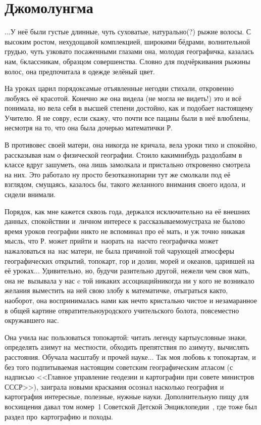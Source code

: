 \newpage
\section*{Джомолунгма}

$\ldots$У неё были густые длинные, чуть суховатые, натурально(?) рыжие волосы. С высоким ростом, нехудощавой комплекцией, широкими бёдрами, волнительной грудью, чуть узковато посаженными глазами она, молодая географичка, казалась нам, 6\sdash классникам, образцом совершенства. Словно для подчёркивания рыжины волос, она предпочитала в одежде зелёный цвет. 

На уроках царил порядок\mdash самые отъявленные негодяи стихали, откровенно любуясь её красотой. Конечно же она видела (не могла не видеть!) это и всё понимала, но вела себя в высшей степени достойно, как и подобает настоящему Учителю. Я не совру, если скажу, что почти все пацаны были в неё влюблены, несмотря на то, что она была дочерью математички Р.

В противовес своей матери, она никогда не кричала, вела уроки тихо и спокойно, рассказывая нам о физической географии. Стоило каким\sdash нибудь раздолбаям в классе вдруг зашуметь, она лишь замолкала и пристально откровенно смотрела на них. Это работало ну просто безотказно\mdash парни тут же смолкали под её взглядом, смущаясь, казалось бы, такого желанного внимания своего идола, и сидели внимали. 

Порядок, как мне кажется сквозь года, держался исключительно на её внешних данных, спокойствии и~личном интересе к рассказываемому\mdash страха не было\mdash во время уроков географии никто не вспоминал про её мать, и уж точно никакая мысль, что Р. может прийти и~наорать на~нас\mdash что географичка может нажаловаться на~нас матери, не была причиной той чарующей атмосферы географических открытий, топокарт, гор и долин, морей и океанов, царившей на её уроках$\ldots$ Удивительно, но, будучи разительно другой, нежели чем своя мать, она не~вызывала у нас c той никаких ассоциаций\mdash никогда ни у кого не возникало желания выместить на ней свою злобу к математичке, отыграться как\sdash то, наоборот, она воспринималась нами как нечто кристально чистое и незамаранное в общей картине отвратительно\sdash уродского учительского болота, повсеместно окружавшего нас.
 
Она учила нас пользоваться топокартой: читать легенду карты\mdash условные знаки, определять азимут на~местности, обходить препятствия по азимуту, вычислять расстояния. Обучала масштабу и прочей науке$\ldots$ Так моя любовь к топокартам, и без того подпитываемая настоящим советским географическим атласом (с надписью <<Главное управление геодезии и картографии при совете министров СССР>>), заиграла новыми красками\mdash я осознал насколько география и картография интересные, полезные, нужные науки. Дополнительную пищу для восхищения давал том номер~1 Советской Детской Энциклопедии~\cite{ДетскаяЭнциклопедия}, где тоже был раздел про~картографию и походы. 


